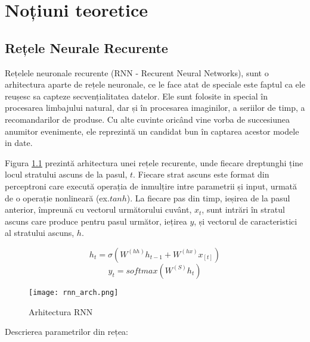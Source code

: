 \chapter{Noțiuni teoretice}

\section{Rețele Neurale Recurente}

Rețelele neuronale recurente (RNN - Recurent Neural Networks), sunt o arhitectura aparte de rețele neuronale, ce le face atat de speciale este faptul ca ele reușesc sa capteze secvențialitatea datelor. Ele sunt folosite in special în procesarea limbajului natural, dar și în procesarea imaginilor, a seriilor de timp, a recomandarilor de produse. Cu alte cuvinte oricând vine vorba de succesiunea anumitor evenimente, ele reprezintă un candidat bun în captarea acestor modele in date.

Figura \ref{fig:rnn_arch} prezintă arhitectura unei rețele recurente, unde fiecare dreptunghi ține locul stratului ascuns de la pasul, $t$. Fiecare strat ascuns este format din perceptroni care execută operația de inmulțire intre parametrii și input, urmată de o operație nonlineară (ex.$ tanh$). La fiecare pas din timp, ieșirea de la pasul anterior, împreună cu vectorul următorului cuvânt, $x_t$, sunt intrări în stratul ascuns care produce pentru pasul următor, iețirea $y$, și vectorul de caracteristici al stratului ascuns, $h$.


$$ h_t = \sigma{(W^{(hh)} h_{t-1} + W^{(hx)} x_{[t]})} $$
$$ y_t = softmax(W^{(S)} h_t) $$


\begin{figure}[h]
	\centering
	\texttt{[image: rnn\_arch.png]}
	\caption{Arhitectura RNN \cite{cs224d_notes}}
	\label{fig:rnn_arch}
\end{figure}

Descrierea parametrilor din rețea:


